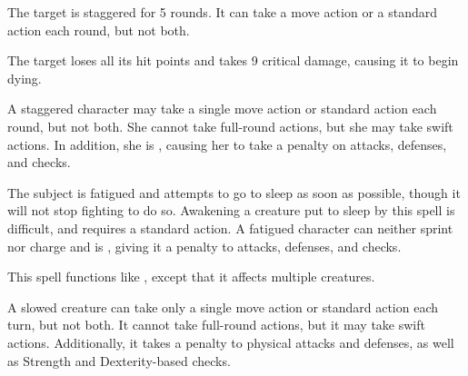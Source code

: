 \begin{spellhealthy}
    The target is staggered for 5 rounds. It can take a move action or a standard action each round, but not both.
\end{spellhealthy}
\begin{spellblood}
    The target loses all its hit points and takes 9 critical damage, causing it to begin dying.
\end{spellblood}
\spellnotes A staggered character may take a single move action or standard action each round, but not both. She cannot take full-round actions, but she may take swift actions. In addition, she is \vulnerable, causing her to take a  penalty on attacks, defenses, and checks.

\spelldur{\durshort}
\spelleffect The subject is fatigued and attempts to go to sleep as soon as possible, though it will not stop fighting to do so. Awakening a creature put to sleep by this spell is difficult, and requires a standard action.
\spellnotes A fatigued character can neither sprint nor charge and is \vulnerable, giving it a  penalty to attacks, defenses, and checks.

\spelleffect This spell functions like , except that it affects multiple creatures.

\spelldur{\durshort}
\spelleffect A slowed creature can take only a single move action or standard action each turn, but not both. It cannot take full-round actions, but it may take swift actions. Additionally, it takes a  penalty to physical attacks and defenses, as well as Strength and Dexterity-based checks.

